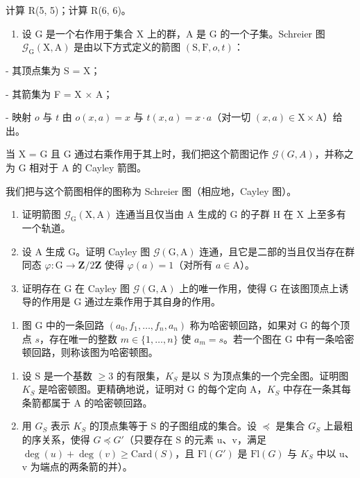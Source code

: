 计算 R(5, 5)；计算 R(6, 6)。

\begin{enumerate}
\def\labelenumi{\arabic{enumi})}
\setcounter{enumi}{6}
\tightlist
\item
  设 G 是一个右作用于集合 X 上的群，A 是 G 的一个子集。Schreier 图 \(\mathcal{G}_{\mathrm{G}}(\mathrm{X},\mathrm{A})\) 是由以下方式定义的箭图 \((\mathrm{S},\mathrm{F},o,t)\)：
\end{enumerate}

- 其顶点集为 S = X；

- 其箭集为 F = X × A；

- 映射 \(o\) 与 \(t\) 由 \(o(x, a) = x\) 与 \(t(x, a) = x \cdot a\)（对一切 \((x, a) \in \mathrm{X} \times \mathrm{A}\)）给出。

  当 X = G 且 G 通过右乘作用于其上时，我们把这个箭图记作 \(\mathcal{G}(G,A)\)，并称之为 G 相对于 A 的 Cayley 箭图。

我们把与这个箭图相伴的图称为 Schreier 图（相应地，Cayley 图）。

\begin{enumerate}
\def\labelenumi{\alph{enumi})}
\item
  证明箭图 \(\mathcal{G}_{\mathrm{G}}(\mathrm{X},\mathrm{A})\) 连通当且仅当由 A 生成的 G 的子群 H 在 X 上至多有一个轨道。
\item
  设 A 生成 G。证明 Cayley 图 \(\mathcal{G}(\mathrm{G},\mathrm{A})\) 连通，且它是二部的当且仅当存在群同态 \(\varphi \colon \mathrm{G}\to \mathbf{Z} / 2\mathbf{Z}\) 使得 \(\varphi (a) = 1\)（对所有 \(a\in \mathrm{A}\)）。
\item
  证明存在 G 在 Cayley 图 \(\mathcal{G}(\mathrm{G},\mathrm{A})\) 上的唯一作用，使得 G 在该图顶点上诱导的作用是 G 通过左乘作用于其自身的作用。
\end{enumerate}

\begin{enumerate}
\def\labelenumi{\arabic{enumi})}
\setcounter{enumi}{7}
\tightlist
\item
  图 G 中的一条回路 \((a_0, f_1, \ldots, f_n, a_n)\) 称为哈密顿回路，如果对 G 的每个顶点 \(s\)，存在唯一的整数 \(m \in \{1, \ldots, n\}\) 使 \(a_m = s\)。若一个图在 G 中有一条哈密顿回路，则称该图为哈密顿图。
\end{enumerate}

\begin{enumerate}
\def\labelenumi{\alph{enumi})}
\item
  设 S 是一个基数 \(\geqslant 3\) 的有限集，\(K_{S}\) 是以 S 为顶点集的一个完全图。证明图 \(K_{S}\) 是哈密顿图。更精确地说，证明对 G 的每个定向 A，\(K_{S}\) 中存在一条其每条箭都属于 A 的哈密顿回路。
\item
  用 \(G_{S}\) 表示 \(K_{S}\) 的顶点集等于 S 的子图组成的集合。设 \(\preccurlyeq\) 是集合 \(G_{S}\) 上最粗的序关系，使得 \(G \preccurlyeq G'\)（只要存在 S 的元素 u、v，满足 \(\deg(u) + \deg(v) \geqslant \text{Card}(S)\)，且 \(\text{Fl}(G')\) 是 \(\text{Fl}(G)\) 与 \(K_{S}\) 中以 u、v 为端点的两条箭的并）。
\end{enumerate}

